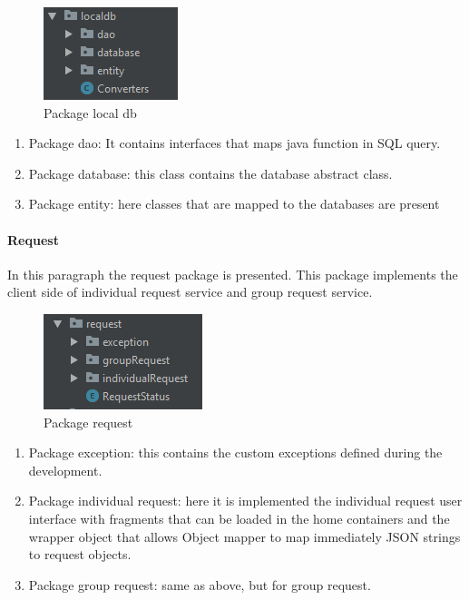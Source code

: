 \begin{figure}[H]
\includegraphics[width=0.6\linewidth]{images/LocalDB.png}
\centering
\caption{ Package local db}
\label{fig:pkgsharedata}
\end{figure}

\begin{enumerate}
\item Package dao: It contains interfaces that maps java function in SQL query.
\item Package database: this class contains the database abstract class.
\item Package entity: here classes that are mapped to the databases are present 
\end{enumerate}

\paragraph{Request}
In this paragraph the request package is presented. 
This package implements the client side of individual request service and group request service.

\begin{figure}[H]
\includegraphics[width=0.6\linewidth]{images/Request.png}
\centering
\caption{ Package request }
\label{fig:pkgsharedata}
\end{figure}

\begin{enumerate}
\item Package exception: this contains the custom exceptions defined during the development.
\item Package individual request: here it is implemented the individual request user interface with fragments that can be loaded in the home
containers and the wrapper object that allows Object mapper to map immediately JSON strings to request objects. 
\item Package group request: same as above, but for group request. 
\end{enumerate}
	
